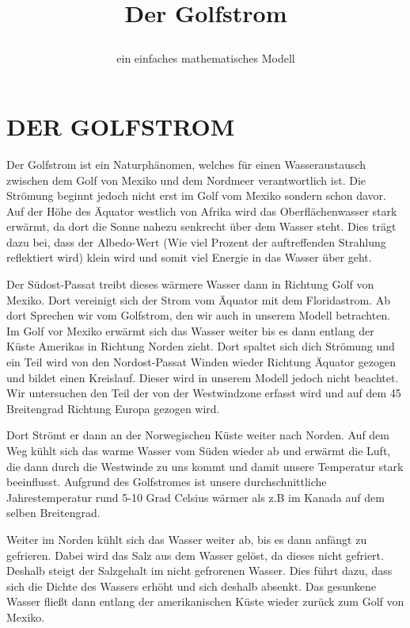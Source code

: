 \documentclass[a4paper,twoside]{article}
\begin{document}
	\title{Der Golfstrom\subtitle{ein einfaches mathematisches Modell} }
	
	\author{}
	

	
	\onecolumn \maketitle \normalsize \vfill

	\section{\uppercase{Der Golfstrom}}\label{sec:Golfstrom}

	\noindent Der Golfstrom ist ein Naturphänomen, welches für einen Wasseraustausch zwischen dem Golf von Mexiko und dem Nordmeer verantwortlich ist. Die Strömung beginnt jedoch nicht erst im Golf vom Mexiko sondern schon davor. Auf der Höhe des Äquator westlich von Afrika wird das Oberflächenwasser stark erwärmt, da dort die Sonne nahezu senkrecht über dem Wasser steht. Dies trägt dazu bei, dass der Albedo-Wert (Wie viel Prozent der auftreffenden Strahlung reflektiert wird) klein wird und somit viel Energie in das Wasser über geht.

Der Südost-Passat treibt dieses wärmere Wasser dann in Richtung Golf von Mexiko. Dort vereinigt sich der Strom vom Äquator mit dem Floridastrom. Ab dort Sprechen wir vom Golfstrom, den wir auch in unserem Modell betrachten. Im Golf vor Mexiko erwärmt sich das Wasser weiter bis es dann entlang der Küste Amerikas in Richtung Norden zieht. Dort spaltet sich dich Strömung und ein Teil wird von den Nordost-Passat Winden wieder Richtung Äquator gezogen und bildet einen Kreislauf. Dieser wird in unserem Modell jedoch nicht beachtet. Wir untersuchen den Teil der von der Westwindzone erfasst wird und auf dem 45 Breitengrad Richtung Europa gezogen wird.

Dort Strömt er dann an der Norwegischen Küste weiter nach Norden. Auf dem Weg kühlt sich das warme Wasser vom Süden wieder ab und erwärmt die Luft, die dann durch die Westwinde zu uns kommt und damit unsere Temperatur stark beeinflusst. Aufgrund des Golfstromes ist unsere durchschnittliche Jahrestemperatur rund 5-10 Grad Celsius wärmer als z.B im Kanada auf dem selben Breitengrad. 

Weiter im Norden kühlt sich das Wasser weiter ab, bis es dann anfängt zu gefrieren. Dabei wird das Salz aus dem Wasser gelöst, da dieses nicht gefriert. Deshalb steigt der Salzgehalt im nicht gefrorenen Wasser. Dies führt dazu, dass sich die Dichte des Wassers erhöht und sich deshalb absenkt. Das gesunkene Wasser fließt dann entlang der amerikanischen Küste wieder zurück zum Golf von Mexiko.
\end{document}
